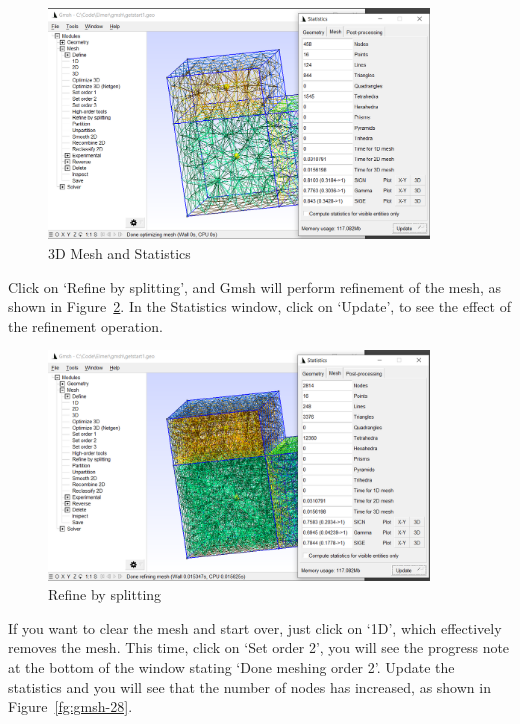 \begin{figure}[H]
\centering
\includegraphics[width=0.9\textwidth]{gmsh-26}
\caption{3D Mesh and Statistics}\label{fg:gmsh-26}
\end{figure}

\newpage

Click on `Refine by splitting', and Gmsh will perform refinement of the mesh, as shown in Figure~\ref{fg:gmsh-27}.  In the Statistics window, click on `Update', to see the effect of the refinement operation. 

\begin{figure}[H]
\centering
\includegraphics[width=0.9\textwidth]{gmsh-27}
\caption{Refine by splitting}\label{fg:gmsh-27}
\end{figure}

If you want to clear the mesh and start over, just click on `1D', which effectively removes the mesh.  This time, click on `Set order 2', you will see the progress note at the bottom of the window stating `Done meshing order 2'.  Update the statistics and you will see that the number of nodes has increased, as shown in Figure~\ref{fg:gmsh-28}.

